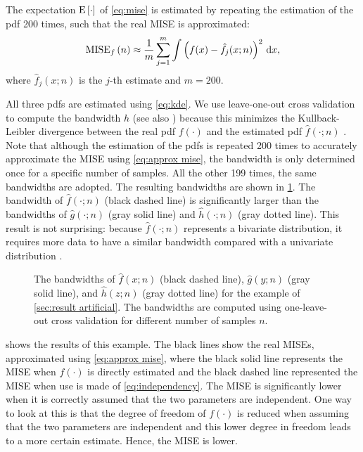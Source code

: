 The expectation $\textup{E} \left[ \cdot \right]$ of \cref{eq:mise} is estimated by repeating the estimation of the pdf 200 times, such that the real MISE is approximated:
\begin{equation}
	\label{eq:approx mise}
	\textup{MISE}_{f}\left( n \right) \approx \frac{1}{m} \sum_{j=1}^m \int \left( f(x) - \hat{f}_j(x;n)\right)^2 \mathrm{\,d} x,
\end{equation}
where $\hat{f}_j(x;n)$ is the $j$-th estimate and $m=200$. 

All three pdfs are estimated using \cref{eq:kde}. We use leave-one-out cross validation to compute the bandwidth $h$ (see also \textcite{duin1976parzen}) because this minimizes the Kullback-Leibler divergence between the real pdf $f(\cdot)$ and the estimated pdf $\hat{f}(\cdot;n)$ \cite{turlach1993bandwidthselection,zambom2013review}. Note that although the estimation of the pdfs is repeated 200 times to accurately approximate the MISE using \cref{eq:approx mise}, the bandwidth is only determined once for a specific number of samples. All the other 199 times, the same bandwidths are adopted. The resulting bandwidths are shown in \cref{fig:bandwidth}. The bandwidth of $\hat{f}(\cdot;n)$ (black dashed line) is significantly larger than the bandwidths of $\hat{g}(\cdot;n)$ (gray solid line) and $\hat{h}(\cdot;n)$ (gray dotted line). This result is not surprising: because $\hat{f}(\cdot;n)$ represents a bivariate distribution, it requires more data to have a similar bandwidth compared with a univariate distribution \cite{scott2005multidimensional}.

\setlength{}
\setlength{}
\begin{figure}
	\centering
	
	\caption{The bandwidths of $\hat{f}(x;n)$ (black dashed line), $\hat{g}(y;n)$ (gray solid line), and $\hat{h}(z;n)$ (gray dotted line) for the example of \cref{sec:result artificial}. The bandwidths are computed using one-leave-out cross validation for different number of samples $n$.}
	\label{fig:bandwidth}
\end{figure}

 shows the results of this example. The black lines show the real MISEs, approximated using \cref{eq:approx mise}, where the black solid line represents the MISE when $f(\cdot)$ is directly estimated and the black dashed line represented the MISE when use is made of \cref{eq:independency}. The MISE is significantly lower when it is correctly assumed that the two parameters are independent. One way to look at this is that the degree of freedom of $f(\cdot)$ is reduced when assuming that the two parameters are independent and this lower degree in freedom leads to a more certain estimate. Hence, the MISE is lower.

